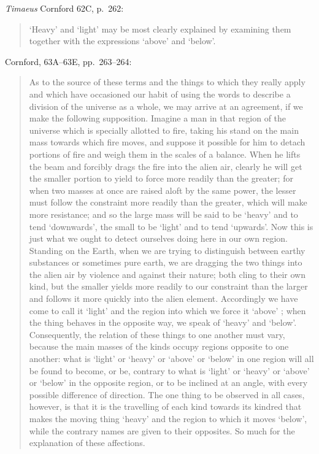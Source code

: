 \documentclass{article}
\begin{document}
{\em Timaeus} Cornford 62C, p.~262:

\begin{quote}
`Heavy' and `light' may be most clearly explained by
examining them together with the expressions `above' and `below'.
\end{quote}

Cornford, 63A--63E, pp.~263--264:

\begin{quote}
As to the source of these terms and the things to which
they really apply and which have occasioned our habit of
using the words to describe a division of the universe as a
whole, we may arrive at an agreement, if we make the
following supposition. Imagine a man in that region of the
universe which is specially allotted to fire, taking his stand
on the main mass towards which fire moves, and suppose it
possible for him to detach portions of fire and weigh them
in the scales of a balance. When he lifts the beam and
forcibly drags the fire into the alien air, clearly he will get
the smaller portion to yield to force more readily than the
greater; for when two masses at once are raised aloft by
the same power, the lesser must follow the constraint more
readily than the greater, which will make more resistance;
and so the large mass will be said to be `heavy' and to tend
`downwards', the small to be `light' and to tend `upwards'.
Now this is just what we ought to detect ourselves doing
here in our own region. Standing on the Earth, when we
are trying to distinguish between earthy substances or
sometimes pure earth, we are dragging the two things
into the alien air by violence and against their nature; both
cling to their own kind, but the smaller yields more readily
to our constraint than the larger and follows it more quickly
into the alien element. Accordingly we have come to call
it `light' and the region into which we force it `above' ;
when the thing behaves in the opposite way, we speak of
`heavy' and `below'. Consequently, the relation of these
things to one another must vary, because the main masses
of the kinds occupy regions opposite to one another: what
is `light' or `heavy' or `above' or `below' in one region
will all be found to become, or be, contrary to what is `light'
or `heavy' or `above' or `below' in the opposite region,
or to be inclined at an angle, with every possible difference
of direction. The one thing to be observed in all cases,
however, is that it is the travelling of each kind towards its
kindred that makes the moving thing `heavy' and the
region to which it moves `below', while the contrary names
are given to their opposites. So much for the explanation
of these affections.
\end{quote}
\end{document}
